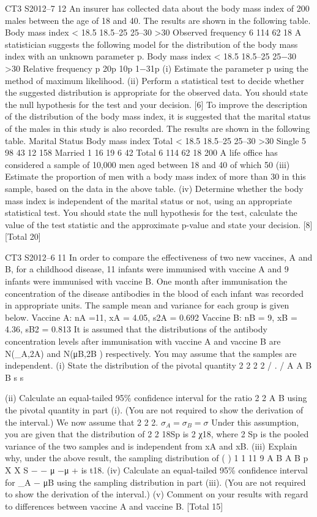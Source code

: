 CT3 S2012–7 
12 An insurer has collected data about the body mass index of 200 males between the
age of 18 and 40. The results are shown in the following table.
Body mass index < 18.5 18.5–25 25–30 >30
Observed frequency 6 114 62 18
A statistician suggests the following model for the distribution of the body mass index
with an unknown parameter p.
Body mass index < 18.5 18.5–25 25−30 >30
Relative frequency p 20p 10p 1−31p
(i) Estimate the parameter p using the method of maximum likelihood. 
(ii) Perform a statistical test to decide whether the suggested distribution is
appropriate for the observed data. You should state the null hypothesis for the
test and your decision. [6]
To improve the description of the distribution of the body mass index, it is suggested
that the marital status of the males in this study is also recorded. The results are
shown in the following table.
Marital Status Body mass index Total
< 18.5 18.5–25 25–30 >30
Single 5 98 43 12 158
Married 1 16 19 6 42
Total 6 114 62 18 200
A life office has considered a sample of 10,000 men aged between 18 and 40 of which
50%
(iii) Estimate the proportion of men with a body mass index of more than 30 in this
sample, based on the data in the above table. 
(iv) Determine whether the body mass index is independent of the marital status or
not, using an appropriate statistical test. You should state the null hypothesis
for the test, calculate the value of the test statistic and the approximate
p-value and state your decision. [8]
[Total 20]

  CT3 S2012–6
11 In order to compare the effectiveness of two new vaccines, A and B, for a childhood
disease, 11 infants were immunised with vaccine A and 9 infants were immunised
with vaccine B. One month after immunisation the concentration of the disease
antibodies in the blood of each infant was recorded in appropriate units. The sample
mean and variance for each group is given below.
Vaccine A: nA =11, xA = 4.05, s2A = 0.692
Vaccine B: nB = 9, xB = 4.36, sB2 = 0.813
It is assumed that the distributions of the antibody concentration levels after
immunisation with vaccine A and vaccine B are N(\mu_A,\sigma2A) and N(μB,\sigma2B )
respectively. You may assume that the samples are independent.
(i) State the distribution of the pivotal quantity
2 2
2 2
/ .
/
  A A
B B
s
s
\sigma
\sigma

(ii) Calculate an equal-tailed 95\%  confidence interval for the ratio
2
2
A
B
\sigma
\sigma
using the
pivotal quantity in part (i). (You are not required to show the derivation of the
                               interval.) 
We now assume that 2 2 2. $\sigma_A = \sigma_B = \sigma$ Under this assumption, you are given that the
distribution of
2
2
18Sp
\sigma
is 2
χ18, where 2
Sp is the pooled variance of the two samples and
is independent from xA and xB.
(iii) Explain why, under the above result, the sampling distribution of
( )
1 1
11 9
A B A B
p
X X
S
− − μ −μ
+
  is t18. 
(iv) Calculate an equal-tailed 95\%  confidence interval for \mu_A − μB using the
sampling distribution in part (iii). (You are not required to show the
                                      derivation of the interval.) 
(v) Comment on your results with regard to differences between vaccine A and
vaccine B. 
[Total 15]
